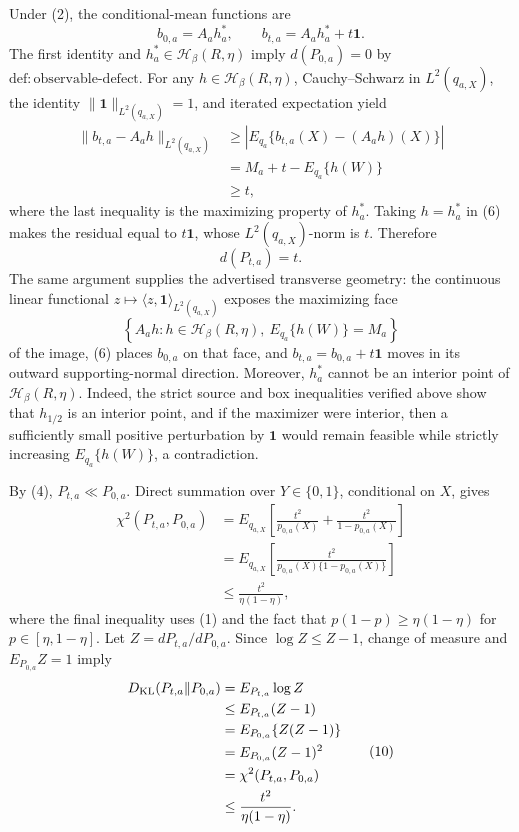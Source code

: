 Under (2), the conditional-mean functions are
\[
b_{0,a}=A_a h_a^*,
\qquad
b_{t,a}=A_a h_a^*+t\mathbf 1. \tag{6}
\]
The first identity and \(h_a^*\in\mathcal H_\beta(R,\eta)\) imply \(d(P_{0,a})=0\) by \(\mathrm{def:observable\mbox{-}defect}\). For any \(h\in\mathcal H_\beta(R,\eta)\), Cauchy--Schwarz in \(L^2(q_{a,X})\), the identity \(\|\mathbf1\|_{L^2(q_{a,X})}=1\), and iterated expectation yield
\[
\begin{aligned}
\|b_{t,a}-A_a h\|_{L^2(q_{a,X})}
&\ge \left|E_{q_a}\{b_{t,a}(X)-(A_a h)(X)\}\right|\\
&=M_a+t-E_{q_a}\{h(W)\}\\
&\ge t,
\end{aligned} \tag{7}
\]
where the last inequality is the maximizing property of \(h_a^*\). Taking \(h=h_a^*\) in (6) makes the residual equal to \(t\mathbf1\), whose \(L^2(q_{a,X})\)-norm is \(t\). Therefore
\[
d(P_{t,a})=t. \tag{8}
\]
The same argument supplies the advertised transverse geometry: the continuous linear functional \(z\mapsto\langle z,\mathbf1\rangle_{L^2(q_{a,X})}\) exposes the maximizing face
\[
\left\{A_a h:h\in\mathcal H_\beta(R,\eta),\ E_{q_a}\{h(W)\}=M_a\right\}
\]
of the image, (6) places \(b_{0,a}\) on that face, and \(b_{t,a}=b_{0,a}+t\mathbf1\) moves in its outward supporting-normal direction. Moreover, \(h_a^*\) cannot be an interior point of \(\mathcal H_\beta(R,\eta)\). Indeed, the strict source and box inequalities verified above show that \(h_{1/2}\) is an interior point, and if the maximizer were interior, then a sufficiently small positive perturbation by \(\mathbf1\) would remain feasible while strictly increasing \(E_{q_a}\{h(W)\}\), a contradiction.

By (4), \(P_{t,a}\ll P_{0,a}\). Direct summation over \(Y\in\{0,1\}\), conditional on \(X\), gives
\[
\begin{aligned}
\chi^2(P_{t,a},P_{0,a})
&=E_{q_{a,X}}\!\left[
  \frac{t^2}{p_{0,a}(X)}+
  \frac{t^2}{1-p_{0,a}(X)}\right]\\
&=E_{q_{a,X}}\!\left[
  \frac{t^2}{p_{0,a}(X)\{1-p_{0,a}(X)\}}\right]\\
&\le\frac{t^2}{\eta(1-\eta)},
\end{aligned} \tag{9}
\]
where the final inequality uses (1) and the fact that \(p(1-p)\ge\eta(1-\eta)\) for \(p\in[\eta,1-\eta]\). Let \(Z=dP_{t,a}/dP_{0,a}\). Since \(\log Z\le Z-1\), change of measure and \(E_{P_{0,a}}Z=1\) imply
\[
\begin{aligned}
D_{\rm KL}(P_{t,a}\|P_{0,a})
&=E_{P_{t,a}}\log Z\\
&\le E_{P_{t,a}}(Z-1)\\
&=E_{P_{0,a}}\{Z(Z-1)\}\\
&=E_{P_{0,a}}(Z-1)^2\\
&=\chi^2(P_{t,a},P_{0,a})\\
&\le\frac{t^2}{\eta(1-\eta)}. 
\end{aligned} \tag{10}
\]

